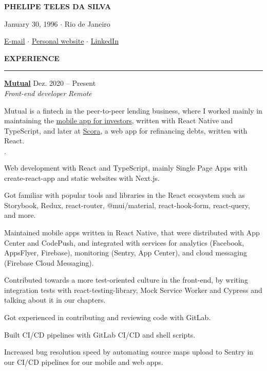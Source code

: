 \documentclass[12pt]{article}
\newenvironment{tightlist}
  {\begin{list}
    {$\cdot$}
    {
      \setlength{\leftmargin}{0em}
      \setlength{\itemsep}{\smallskipamount}
    }
  }
{\end{list}}
\begin{document}
\pagestyle{empty}

\centerline{\huge\bf PHELIPE TELES DA SILVA}
\medskip

\centerline{January 30, 1996 $\cdot$ Rio de Janeiro}
\smallskip

\centerline{
  \href{mailto:telesphelipe@gmail.com}{E-mail}
  $\cdot$
  \href{https://phelipetls.github.io}{Personal website}
  $\cdot$
  \href{https://linkedin.com/in/phelipeteles}{LinkedIn}
}
\smallskip

\medskip \textbf{EXPERIENCE} \medskip
\hrule

\textbf{\href{https://mutual.club}{Mutual}} \hfill Dez. 2020 -- Present \\
\textit{Front-end developer} \hfill \textit{Remote} {\parfillskip=0pt\par}

Mutual is a fintech in the peer-to-peer lending business, where I worked mainly
in maintaining the \href{https://mutual.club/en/invest.html}{mobile app for
investors}, written with React Native and TypeScript, and later at
\href{https://scora.com.br/}{Scora}, a web app for refinancing debts, written
with React.

\medskip

\begin{tightlist}
  \item Web development with React and TypeScript, mainly Single Page Apps with
    create-react-app and static websites with Next.js.
  \item Got familiar with popular tools and libraries in the React ecosystem
    such as Storybook, Redux, react-router, @mui/material, react-hook-form,
    react-query, and more.
  \item Maintained mobile apps written in React Native, that were distributed
    with App Center and CodePush, and integrated with services for analytics
    (Facebook, AppsFlyer, Firebase), monitoring (Sentry, App Center), and cloud
    messaging (Firebase Cloud Messaging).
  \item Contributed towards a more test-oriented culture in the front-end, by
    writing integration tests with react-testing-library, Mock Service Worker
    and Cypress and talking about it in our chapters.
  \item Got experienced in contributing and reviewing code with GitLab.
  \item Built CI/CD pipelines with GitLab CI/CD and shell scripts.
  \item Increased bug resolution speed by automating source maps upload to
    Sentry in our CI/CD pipelines for our mobile and web apps.
\end{tightlist}
\end{document}
